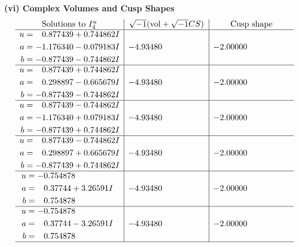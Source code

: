 \documentclass[1p]{elsarticle_modified}
\theoremstyle{definition}
\newcommand{\I}{\sqrt{-1}}
\begin{document}
\newpage\flushleft \textbf{(vi) Complex Volumes and Cusp Shapes}
$$\begin{array}{c|c|c}  
\text{Solutions to }I^u_{4}& \I (\text{vol} + \sqrt{-1}CS) & \text{Cusp shape}\\
 \hline 
\begin{aligned}
u &= \phantom{-}0.877439 + 0.744862 I \\
a &= -1.176340 - 0.079183 I \\
b &= -0.877439 - 0.744862 I\end{aligned}
 & -4.93480\phantom{ +0.000000I} & -2.00000\phantom{ +0.000000I} \\ \hline\begin{aligned}
u &= \phantom{-}0.877439 + 0.744862 I \\
a &= \phantom{-}0.298897 - 0.665679 I \\
b &= -0.877439 - 0.744862 I\end{aligned}
 & -4.93480\phantom{ +0.000000I} & -2.00000\phantom{ +0.000000I} \\ \hline\begin{aligned}
u &= \phantom{-}0.877439 - 0.744862 I \\
a &= -1.176340 + 0.079183 I \\
b &= -0.877439 + 0.744862 I\end{aligned}
 & -4.93480\phantom{ +0.000000I} & -2.00000\phantom{ +0.000000I} \\ \hline\begin{aligned}
u &= \phantom{-}0.877439 - 0.744862 I \\
a &= \phantom{-}0.298897 + 0.665679 I \\
b &= -0.877439 + 0.744862 I\end{aligned}
 & -4.93480\phantom{ +0.000000I} & -2.00000\phantom{ +0.000000I} \\ \hline\begin{aligned}
u &= -0.754878\phantom{ +0.000000I} \\
a &= \phantom{-}0.37744 + 3.26591 I \\
b &= \phantom{-}0.754878\phantom{ +0.000000I}\end{aligned}
 & -4.93480\phantom{ +0.000000I} & -2.00000\phantom{ +0.000000I} \\ \hline\begin{aligned}
u &= -0.754878\phantom{ +0.000000I} \\
a &= \phantom{-}0.37744 - 3.26591 I \\
b &= \phantom{-}0.754878\phantom{ +0.000000I}\end{aligned}
 & -4.93480\phantom{ +0.000000I} & -2.00000\phantom{ +0.000000I}\\
 \hline 
 \end{array}$$\newpage
\end{document}
